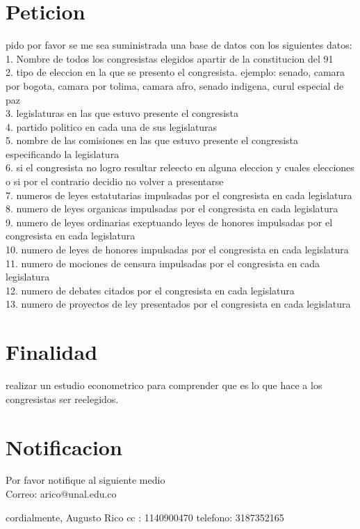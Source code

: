 \documentclass{article}
\begin{document}
\section{Peticion}
\begin{flushleft}

    pido por favor se me sea suministrada una base de datos con los siguientes datos:\\
    1. Nombre de todos los congresistas elegidos apartir de la constitucion del 91\\
    2. tipo de eleccion en la que se presento el congresista. ejemplo: senado, camara por bogota, camara por tolima, camara afro, senado indigena, curul especial de paz\\
    3. legislaturas en las que estuvo presente el congresista\\
    4. partido politico en cada una de sus legislaturas\\
    5. nombre de las comisiones en las que estuvo presente el congresista especificando la legislatura\\
    6. si el congresista no logro resultar releecto en alguna eleccion y cuales elecciones o si por el contrario decidio no volver a presentarse\\
    7. numeros de leyes estatutarias impulsadas por el congresista en cada legislatura\\
    8. numero de leyes organicas impulsadas por el congresista en cada legislatura\\
    9. numero de leyes ordinarias exeptuando leyes de honores impulsadas por el congresista en cada legislatura\\
    10. numero de leyes de honores impulsadas por el congresista en cada legislatura\\
    11. numero de mociones de censura impulsadas por el congresista en cada legislatura\\
    12. numero de debates citados por el congresista en cada legislatura\\
    13. numero de proyectos de ley presentados por el congresista en cada legislatura\\


\end{flushleft}

\section{Finalidad}
\begin{flushleft}
    realizar un estudio econometrico para comprender que es lo que hace a los congresistas ser reelegidos.
\end{flushleft}

\section{Notificacion}

\begin{flushleft}
    Por favor notifique al siguiente medio\\
    Correo: arico@unal.edu.co
\end{flushleft}

\begin{flushleft}
    cordialmente, Augusto Rico
    cc : 1140900470
    telefono: 3187352165
\end{flushleft}
\end{document}
